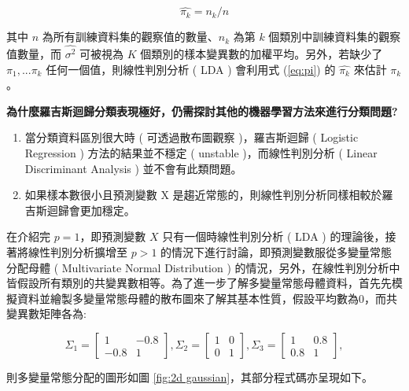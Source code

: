 \begin{equation}\label{eq:pi}
\hat{\pi_k}=n_k/n
\end{equation}

其中 $n$ 為所有訓練資料集的觀察值的數量、$n_k$ 為第 $k$ 個類別中訓練資料集的觀察值數量，而 $\hat{\sigma^{2}}$ 可被視為 $K$ 個類別的樣本變異數的加權平均。另外，若缺少了 $\pi_1,...\pi_k$ 任何一個值，則線性判別分析 ( LDA ) 會利用式 (\ref{eq:pi}) 的 $\hat{\pi_k}$ 來估計 $\pi_k$。

\newpage

\textbf{為什麼羅吉斯迴歸分類表現極好，仍需探討其他的機器學習方法來進行分類問題? }

\begin{enumerate}
\item{} 當分類資料區別很大時 ( 可透過散布圖觀察 )，羅吉斯迴歸 ( Logistic Regression ) 方法的結果並不穩定 ( unstable )，而線性判別分析 ( Linear Discriminant Analysis ) 並不會有此類問題。

\item{} 如果樣本數很小且預測變數 X 是趨近常態的，則線性判別分析同樣相較於羅吉斯迴歸會更加穩定。
\end{enumerate}

在介紹完 $p=1$，即預測變數 $X$ 只有一個時線性判別分析 ( LDA ) 的理論後，接著將線性判別分析擴增至 $p>1$ 的情況下進行討論，即預測變數服從多變量常態分配母體 ( Multivariate Normal Distribution ) 的情況，另外，在線性判別分析中皆假設所有類別的共變異數相等。為了進一步了解多變量常態母體資料，首先先模擬資料並繪製多變量常態母體的散布圖來了解其基本性質，假設平均數為0，而共變異數矩陣各為:

$$ \Sigma_1 = \left[
            \begin{array}{clr}
                1  & -0.8\\
                -0.8 & 1
            \end{array} \right] ,            
            \Sigma_2 = \left[
            \begin{array}{clr}
                1 & 0  \\
                0 & 1
            \end{array} \right] ,
            \Sigma_3 = \left[
            \begin{array}{clr}
                1 & 0.8  \\
                0.8 & 1 
            \end{array} \right] ,$$ 
            
則多變量常態分配的圖形如圖 \ref{fig:2d gaussian}，其部分程式碼亦呈現如下。
       
